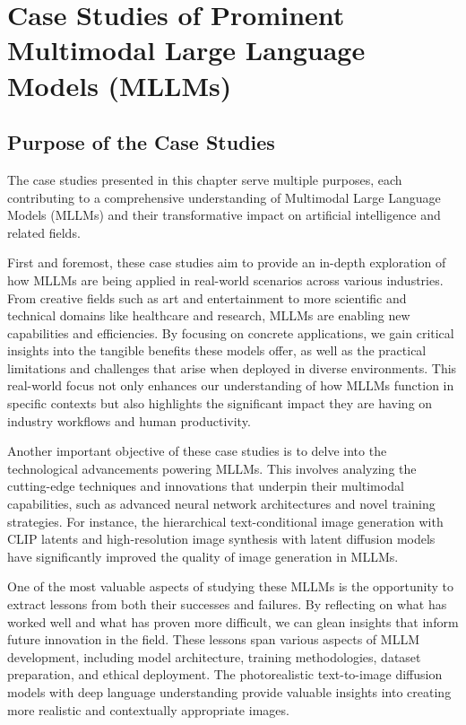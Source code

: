 \chapter{Case Studies of Prominent Multimodal Large Language Models (MLLMs)}

\section{Purpose of the Case Studies}
The case studies presented in this chapter serve multiple purposes, each contributing to a comprehensive understanding of Multimodal Large Language Models (MLLMs) and their transformative impact on artificial intelligence and related fields.

First and foremost, these case studies aim to provide an in-depth exploration of how MLLMs are being applied in real-world scenarios across various industries. From creative fields such as art and entertainment to more scientific and technical domains like healthcare and research, MLLMs are enabling new capabilities and efficiencies. By focusing on concrete applications, we gain critical insights into the tangible benefits these models offer, as well as the practical limitations and challenges that arise when deployed in diverse environments. This real-world focus not only enhances our understanding of how MLLMs function in specific contexts but also highlights the significant impact they are having on industry workflows and human productivity.

Another important objective of these case studies is to delve into the technological advancements powering MLLMs. This involves analyzing the cutting-edge techniques and innovations that underpin their multimodal capabilities, such as advanced neural network architectures and novel training strategies. For instance, the hierarchical text-conditional image generation with CLIP latents \cite{ramesh2022hierarchical} and high-resolution image synthesis with latent diffusion models \cite{rombach2022high} have significantly improved the quality of image generation in MLLMs.

One of the most valuable aspects of studying these MLLMs is the opportunity to extract lessons from both their successes and failures. By reflecting on what has worked well and what has proven more difficult, we can glean insights that inform future innovation in the field. These lessons span various aspects of MLLM development, including model architecture, training methodologies, dataset preparation, and ethical deployment. The photorealistic text-to-image diffusion models with deep language understanding \cite{saharia2022photorealistic} provide valuable insights into creating more realistic and contextually appropriate images.

